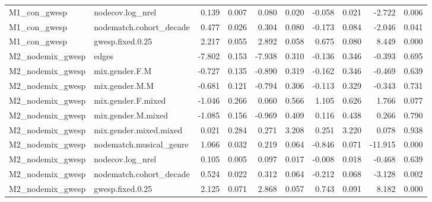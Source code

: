\begin{table}
\begin{tabular}{llrrrrrrrr}
    M1\_con\_gwesp &        nodecov.log\_nrel &         0.139 &   0.007 &          0.080 &    0.020 &      -0.058 &    0.021 &  -2.722 & 0.006 \\
    M1\_con\_gwesp & nodematch.cohort\_decade &         0.477 &   0.026 &          0.304 &    0.080 &      -0.173 &    0.084 &  -2.046 & 0.041 \\
    M1\_con\_gwesp &        gwesp.fixed.0.25 &         2.217 &   0.055 &          2.892 &    0.058 &       0.675 &    0.080 &   8.449 & 0.000 \\
M2\_nodemix\_gwesp &                   edges &        -7.802 &   0.153 &         -7.938 &    0.310 &      -0.136 &    0.346 &  -0.393 & 0.695 \\
M2\_nodemix\_gwesp &          mix.gender.F.M &        -0.727 &   0.135 &         -0.890 &    0.319 &      -0.162 &    0.346 &  -0.469 & 0.639 \\
M2\_nodemix\_gwesp &          mix.gender.M.M &        -0.681 &   0.121 &         -0.794 &    0.306 &      -0.113 &    0.329 &  -0.343 & 0.731 \\
M2\_nodemix\_gwesp &      mix.gender.F.mixed &        -1.046 &   0.266 &          0.060 &    0.566 &       1.105 &    0.626 &   1.766 & 0.077 \\
M2\_nodemix\_gwesp &      mix.gender.M.mixed &        -1.085 &   0.156 &         -0.969 &    0.409 &       0.116 &    0.438 &   0.266 & 0.790 \\
M2\_nodemix\_gwesp &  mix.gender.mixed.mixed &         0.021 &   0.284 &          0.271 &    3.208 &       0.251 &    3.220 &   0.078 & 0.938 \\
M2\_nodemix\_gwesp & nodematch.musical\_genre &         1.066 &   0.032 &          0.219 &    0.064 &      -0.846 &    0.071 & -11.915 & 0.000 \\
M2\_nodemix\_gwesp &        nodecov.log\_nrel &         0.105 &   0.005 &          0.097 &    0.017 &      -0.008 &    0.018 &  -0.468 & 0.639 \\
M2\_nodemix\_gwesp & nodematch.cohort\_decade &         0.524 &   0.022 &          0.312 &    0.064 &      -0.212 &    0.068 &  -3.128 & 0.002 \\
M2\_nodemix\_gwesp &        gwesp.fixed.0.25 &         2.125 &   0.071 &          2.868 &    0.057 &       0.743 &    0.091 &   8.182 & 0.000 \\
\bottomrule
\end{tabular}
\end{table}
